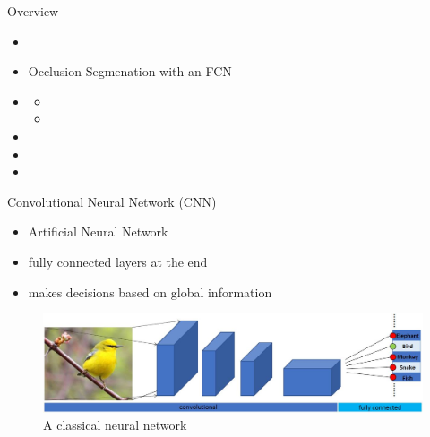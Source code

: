 \documentclass{beamer}
\begin{document}
\begin{frame}[c]{Overview}
	\begin{itemize}
		\item {}
		\item Occlusion Segmenation with an FCN
		\item {}
		\begin{itemize}
			\item {}
			\item {}
		\end{itemize}
		\item {}
		\item {}
		\item {}
	\end{itemize}
\end{frame}

\begin{frame}[c]{Convolutional Neural Network (CNN)}
		\begin{itemize}
			\item Artificial Neural Network
			\item fully connected layers at the end
			\item makes decisions based on global information
		\end{itemize}
		
		\begin{figure}
			\includegraphics[width=1\textwidth]{intro/classicalCNN.JPG}
			\caption{A classical neural network}
		\end{figure}
\end{frame}
\end{document}
